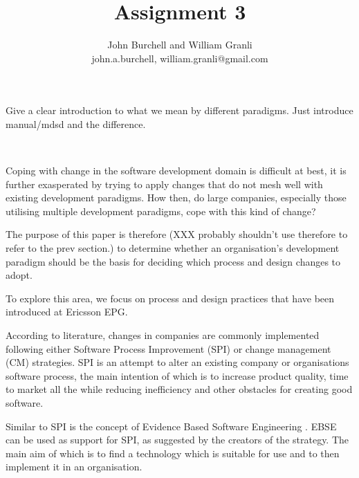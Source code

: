 \documentclass[times, 10pt,twocolumn]{Article}
\begin{document}
\title{Assignment 3}

\author{John Burchell and William Granli \\
john.a.burchell, william.granli@gmail.com}


\maketitle
\thispagestyle{empty}



Give a clear introduction to what we mean by different paradigms. Just introduce manual/mdsd and the difference. 

​

Coping with change in the software development domain is difficult at best, it is further exasperated by trying to apply changes that do not mesh well with existing development paradigms. How then, do large companies, especially those utilising multiple development paradigms, cope with this kind of change?

The purpose of this paper is therefore (XXX probably shouldn't use therefore to refer to the prev section.) to determine whether an organisation's development paradigm should be the basis for deciding which process and design changes to adopt. 

To explore this area, we focus on process and design practices that have been introduced at Ericsson EPG.


According to literature, changes in companies are commonly implemented following either Software Process Improvement (SPI)\cite{pettersson2008practitioner}\cite{unterkalmsteiner2012evaluation} or change management (CM) strategies. SPI is an attempt to alter an existing company or organisations software process, the main intention of which is to increase product quality, time to market all the while reducing inefficiency and other obstacles for creating good software. 

Similar to SPI is the concept of Evidence Based Software Engineering \cite{dyba2005evidence}. EBSE can be used as support for SPI, as suggested by the creators of the strategy. The main aim of which is to find a technology which is suitable for use and to then implement it in an organisation.
\end{document}
